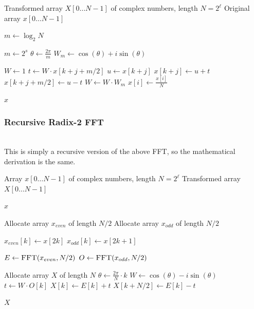 \documentclass{article}
\begin{document}
\begin{algorithm}[H]
\caption{Iterative Radix-2 IFFT}
\begin{algorithmic}[1]
\Require Transformed array $X[0 \dots N-1]$ of complex numbers, length $N = 2^\ell$
\Ensure Original array $x[0 \dots N-1]$


\State $m \gets \log_2 N$
\State {}

    \State $m \gets 2^s$ 
    \State $\theta \gets \frac{2\pi}{m}$
        \State $W_m \gets \cos(\theta) + i\sin(\theta)$ 
        
            \State $W \gets 1$
                \State $t \gets W \cdot x[k + j + m/2]$
                \State $u \gets x[k + j]$
                \State $x[k + j] \gets u + t$ 
                \State $x[k + j + m/2] \gets u - t$ 
                \State $W \gets W \cdot W_m$ 
                \EndFor
        \EndFor
    \EndFor
    \State $x[i] \gets \frac{x[i]}{N}$
\EndFor

    \State \Return $x$
\EndProcedure
\end{algorithmic}
\end{algorithm}
\subsubsection{Recursive Radix-2 FFT}~{}\\
This is simply a recursive version of the above FFT, so the mathematical derivation is the same.
\begin{algorithm}[H]
\caption{Recursive Radix-2 FFT}
\label{alg:recursive_radix2_fft}
\begin{algorithmic}[1]
\Require Array $x[0 \dots N-1]$ of complex numbers, length $N = 2^\ell$
\Ensure Transformed array $X[0 \dots N-1]$

        \State \Return $x$
    \EndIf

    \State Allocate array $x_{even}$ of length $N/2$
    \State Allocate array $x_{odd}$ of length $N/2$
    
        \State $x_{even}[k] \gets x[2k]$
        \State $x_{odd}[k] \gets x[2k + 1]$
    \EndFor

    \State $E \gets \Call{FFT}{x_{even}, N/2}$ 
    \State $O \gets \Call{FFT}{x_{odd}, N/2}$

    \State Allocate array $X$ of length $N$
    \State $\theta \gets \frac{2\pi}{N} \cdot k$
        \State $W \gets \cos(\theta) - i\sin(\theta)$
        \State $t \gets W \cdot O[k]$
        \State $X[k] \gets E[k] + t$
        \State $X[k + N/2] \gets E[k] - t$
    \EndFor

    \State \Return $X$
\EndProcedure
\end{algorithmic}
\end{algorithm}
\end{document}

